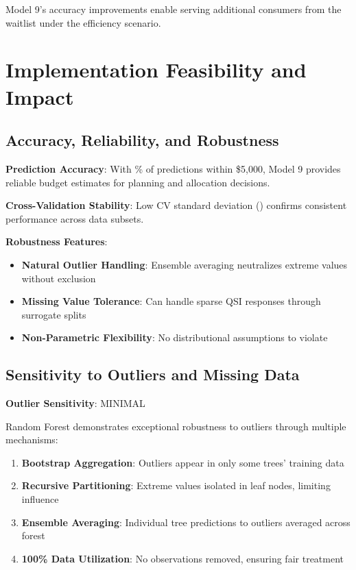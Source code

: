 Model 9's accuracy improvements enable serving \ModelNinePopmodelefficiencyWaitlistChange{} additional consumers from the waitlist under the efficiency scenario.

\section{Implementation Feasibility and Impact}

\subsection{Accuracy, Reliability, and Robustness}

\textbf{Prediction Accuracy}: With \ModelNineWithinFiveK{}\% of predictions within \$5,000, Model 9 provides reliable budget estimates for planning and allocation decisions.

\textbf{Cross-Validation Stability}: Low CV standard deviation (\ModelNineCVStd{}) confirms consistent performance across data subsets.

\textbf{Robustness Features}:
\begin{itemize}
    \item \textbf{Natural Outlier Handling}: Ensemble averaging neutralizes extreme values without exclusion
    \item \textbf{Missing Value Tolerance}: Can handle sparse QSI responses through surrogate splits
    \item \textbf{Non-Parametric Flexibility}: No distributional assumptions to violate
\end{itemize}

\subsection{Sensitivity to Outliers and Missing Data}

\textbf{Outlier Sensitivity}: MINIMAL

Random Forest demonstrates exceptional robustness to outliers through multiple mechanisms:

\begin{enumerate}
    \item \textbf{Bootstrap Aggregation}: Outliers appear in only some trees' training data
    \item \textbf{Recursive Partitioning}: Extreme values isolated in leaf nodes, limiting influence
    \item \textbf{Ensemble Averaging}: Individual tree predictions to outliers averaged across forest
    \item \textbf{100\% Data Utilization}: No observations removed, ensuring fair treatment
\end{enumerate}

